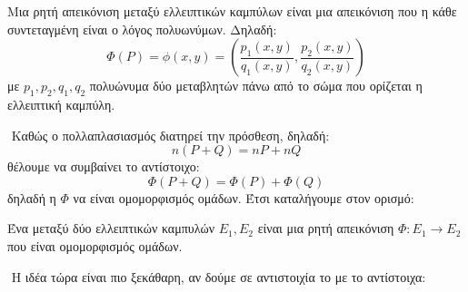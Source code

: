 \documentclass[oneside,a4paper]{article}
\begin{document}
\vspace*{0.1cm}
\begin{defn}
	Μια ρητή απεικόνιση μεταξύ ελλειπτικών καμπύλων είναι μια απεικόνιση που η κάθε συντεταγμένη είναι ο λόγος πολυωνύμων. Δηλαδή:
	$$\Phi(P) = \phi(x,y) = \left(\frac{p_1(x,y)}{q_1(x,y)}, \frac{p_2(x,y)}{q_2(x,y)}\right)$$ με $p_1,p_2,q_1,q_2$ πολυώνυμα δύο μεταβλητών πάνω από το σώμα που ορίζεται η ελλειπτική καμπύλη.
\end{defn}

$ $\newline
Καθώς ο πολλαπλασιασμός διατηρεί την πρόσθεση, δηλαδή:
$$n(P+Q) = nP + nQ$$ θέλουμε να συμβαίνει το αντίστοιχο:
$$\Phi(P+Q) = \Phi(P) + \Phi(Q)$$ δηλαδή η $\Phi$ να είναι ομομορφισμός ομάδων. Έτσι καταλήγουμε στον ορισμό:

\vspace*{0.3cm}
\begin{defn}[\tl{Isogeny}]
	Ένα  μεταξύ δύο ελλειπτικών καμπυλών $E_1,E_2$ είναι μια ρητή απεικόνιση $\Phi: E_1 \rightarrow E_2$ που είναι ομομορφισμός ομάδων.
\end{defn}

$ $\newline
Η ιδέα τώρα είναι πιο ξεκάθαρη, αν δούμε σε αντιστοιχία το  με το  αντίστοιχα:
\vspace*{0.3cm}
\begin{figure}[H]
	\centering
\end{figure}


\begin{figure}[H]
	\centering
{}
\end{figure}
\end{document}
